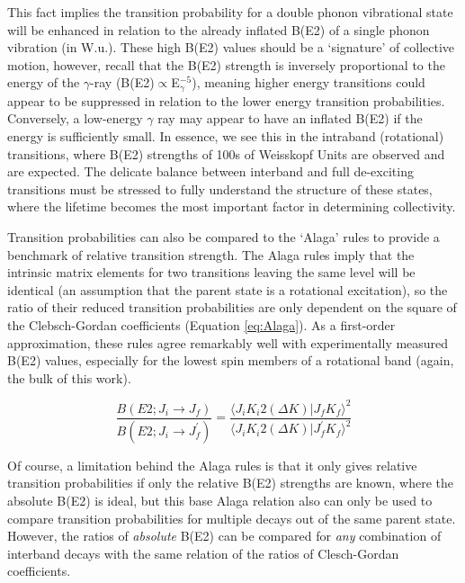 This fact implies the transition probability for a double phonon vibrational state will be enhanced in relation to the already inflated B(E2) of a single phonon vibration (in W.u.). These high B(E2) values should be a `signature' of collective motion, however, recall that the B(E2) strength is inversely proportional to the energy of the $\gamma$-ray (B(E2)$\propto$E$_\gamma^{-5}$), meaning higher energy transitions could appear to be suppressed in relation to the lower energy transition probabilities. Conversely, a low-energy $\gamma$ ray may appear to have an inflated B(E2) if the energy is sufficiently small. In essence, we see this in the intraband (rotational) transitions, where B(E2) strengths of 100s of Weisskopf Units are observed and are expected. The delicate balance between interband and full de-exciting transitions must be stressed to fully understand the structure of these states, where the lifetime becomes the most important factor in determining collectivity. 

Transition probabilities can also be compared to the `Alaga' rules to provide a benchmark of relative transition strength. The Alaga rules imply that the intrinsic matrix elements for two transitions leaving the same level will be identical (an assumption that the parent state is a rotational excitation), so the ratio of their reduced transition probabilities are only dependent on the square of the Clebsch-Gordan coefficients (Equation \ref{eq:Alaga}). As a first-order approximation, these rules agree remarkably well with experimentally measured B(E2) values, especially for the lowest spin members of a rotational band (again, the bulk of this work). 

\begin{equation}\label{eq:Alaga} 
\frac{B(E2;J_i\rightarrow J_f)}{B(E2;J_i\rightarrow J_f^\prime)}=\frac{\langle J_i K_i 2 (\Delta K)\vert J_f K_f\rangle^2}{\langle J_i K_i 2 (\Delta K)\vert J_f^\prime K_f\rangle^2}
\end{equation}

Of course, a limitation behind the Alaga rules is that it only gives relative transition probabilities if only the relative B(E2) strengths are known, where the absolute B(E2) is ideal, but this base Alaga relation also can only be used to compare transition probabilities for multiple decays out of the same parent state. However, the ratios of \textit{absolute} B(E2) can be compared for \textit{any} combination of interband decays with the same relation of the ratios of Clesch-Gordan coefficients.

